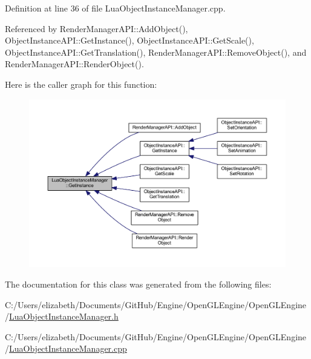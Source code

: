 Definition at line 36 of file Lua\+Object\+Instance\+Manager.\+cpp.



Referenced by Render\+Manager\+A\+P\+I\+::\+Add\+Object(), Object\+Instance\+A\+P\+I\+::\+Get\+Instance(), Object\+Instance\+A\+P\+I\+::\+Get\+Scale(), Object\+Instance\+A\+P\+I\+::\+Get\+Translation(), Render\+Manager\+A\+P\+I\+::\+Remove\+Object(), and Render\+Manager\+A\+P\+I\+::\+Render\+Object().




Here is the caller graph for this function\+:
\nopagebreak
\begin{figure}[H]
\begin{center}
\leavevmode
\includegraphics[width=350pt]{class_lua_object_instance_manager_a62e842ba254f119752b29e8b5d56010f_icgraph}
\end{center}
\end{figure}




The documentation for this class was generated from the following files\+:\begin{DoxyCompactItemize}
\item 
C\+:/\+Users/elizabeth/\+Documents/\+Git\+Hub/\+Engine/\+Open\+G\+L\+Engine/\+Open\+G\+L\+Engine/\hyperlink{_lua_object_instance_manager_8h}{Lua\+Object\+Instance\+Manager.\+h}\item 
C\+:/\+Users/elizabeth/\+Documents/\+Git\+Hub/\+Engine/\+Open\+G\+L\+Engine/\+Open\+G\+L\+Engine/\hyperlink{_lua_object_instance_manager_8cpp}{Lua\+Object\+Instance\+Manager.\+cpp}\end{DoxyCompactItemize}
